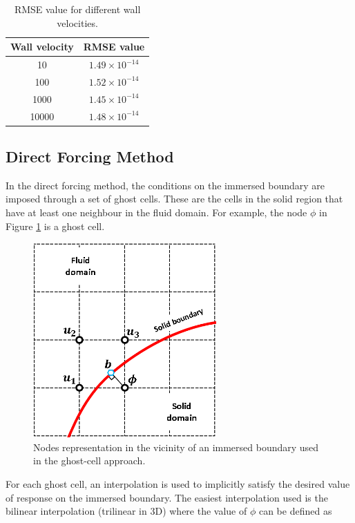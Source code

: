 \begin{table}[H]
\centering
\begin{tabular}{c | c}
     Wall velocity & RMSE value \\ \hline \hline
     10 & $1.49 \times 10^{-14}$ \\ \hline
     100 & $1.52 \times 10^{-14}$ \\ \hline
     1000 & $1.45 \times 10^{-14}$ \\ \hline
     10000 & $1.48 \times 10^{-14}$

\end{tabular}
\caption{RMSE value for different wall velocities.}
\label{table:C3_indirectForcing_wallVelocityRSME}
\end{table}

\subsection{Direct Forcing Method}
In the direct forcing method, the conditions on the immersed boundary are imposed through a set of ghost cells. These are the cells in the solid region that have at least one neighbour in the fluid domain. For example, the node $\phi$ in Figure \ref{fig:C3_ghostCell} is a ghost cell.

\begin{figure}[H]
    \centering
    \includegraphics[width=7.00cm]{Chapter_3/figure/discrete_forcing_approach.png}
    \caption{Nodes representation in the vicinity of an immersed boundary used in the ghost-cell approach.}
    \label{fig:C3_ghostCell}
\end{figure}

For each ghost cell, an interpolation is used to implicitly satisfy the desired value of response on the immersed boundary. The easiest interpolation used is the bilinear interpolation (trilinear in 3D) where the value of $\phi$ can be defined as

